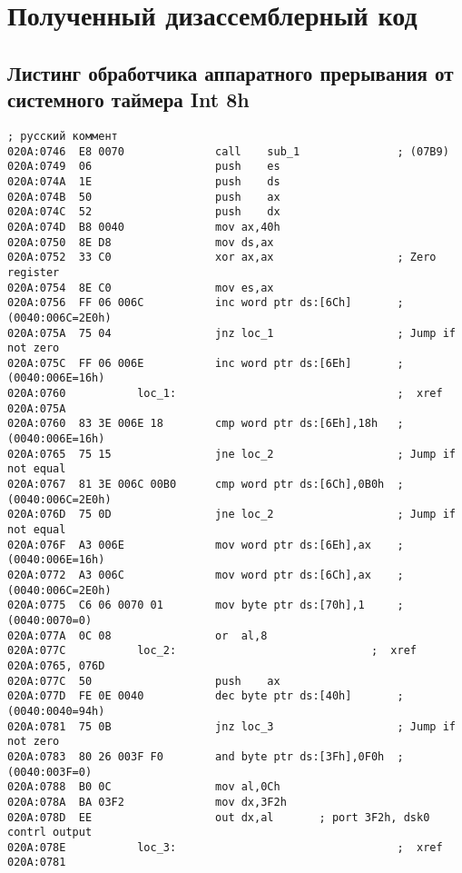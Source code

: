 \chapter{Полученный дизассемблерный код}

\section{Листинг обработчика аппаратного прерывания
         от системного таймера Int 8h}

\begin{lstlisting}[label=Листинг Int8h,caption=Листинг Int8h]
; русский коммент
020A:0746  E8 0070              call    sub_1               ; (07B9)
020A:0749  06                   push    es
020A:074A  1E                   push    ds
020A:074B  50                   push    ax
020A:074C  52                   push    dx
020A:074D  B8 0040              mov ax,40h
020A:0750  8E D8                mov ds,ax
020A:0752  33 C0                xor ax,ax                   ; Zero register
020A:0754  8E C0                mov es,ax
020A:0756  FF 06 006C           inc word ptr ds:[6Ch]       ; (0040:006C=2E0h)
020A:075A  75 04                jnz loc_1                   ; Jump if not zero
020A:075C  FF 06 006E           inc word ptr ds:[6Eh]       ; (0040:006E=16h)
020A:0760           loc_1:                                  ;  xref 020A:075A
020A:0760  83 3E 006E 18        cmp word ptr ds:[6Eh],18h   ; (0040:006E=16h)
020A:0765  75 15                jne loc_2                   ; Jump if not equal
020A:0767  81 3E 006C 00B0      cmp word ptr ds:[6Ch],0B0h  ; (0040:006C=2E0h)
020A:076D  75 0D                jne loc_2                   ; Jump if not equal
020A:076F  A3 006E              mov word ptr ds:[6Eh],ax    ; (0040:006E=16h)
020A:0772  A3 006C              mov word ptr ds:[6Ch],ax    ; (0040:006C=2E0h)
020A:0775  C6 06 0070 01        mov byte ptr ds:[70h],1     ; (0040:0070=0)
020A:077A  0C 08                or  al,8
020A:077C           loc_2:                              ;  xref 020A:0765, 076D
020A:077C  50                   push    ax
020A:077D  FE 0E 0040           dec byte ptr ds:[40h]       ; (0040:0040=94h)
020A:0781  75 0B                jnz loc_3                   ; Jump if not zero
020A:0783  80 26 003F F0        and byte ptr ds:[3Fh],0F0h  ; (0040:003F=0)
020A:0788  B0 0C                mov al,0Ch
020A:078A  BA 03F2              mov dx,3F2h
020A:078D  EE                   out dx,al       ; port 3F2h, dsk0 contrl output
020A:078E           loc_3:                                  ;  xref 020A:0781

\end{lstlisting}
